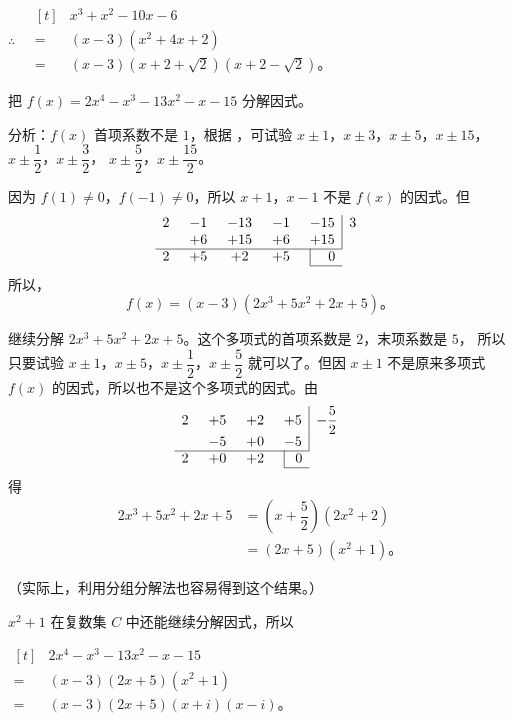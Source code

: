 $\therefore \quad \begin{aligned}[t]
        & x^3 + x^2 - 10x - 6 \\
    ={} & (x - 3) (x^2 + 4x + 2) \\
    ={} & (x - 3) (x + 2 + \sqrt{2}) (x + 2 - \sqrt{2}) \text{。}
\end{aligned}$



\liti 把 $f(x) = 2x^4 - x^3 - 13x^2 -x -15$ 分解因式。

分析：$f(x)$ 首项系数不是 $1$，根据 ，可试验
$x \pm 1$，$x \pm 3$，$x \pm 5$，$x \pm 15$，
$x \pm \dfrac{1}{2}$，$x \pm \dfrac{3}{2}$，
$x \pm \dfrac{5}{2}$，$x \pm \dfrac{15}{2}$。

因为 $f(1) \neq 0$，$f(-1) \neq 0$，所以 $x + 1$，$x - 1$ 不是 $f(x)$ 的因式。但
$$
\begin{array}{*{4}{c@{\hspace{0.5cm}}}c|l}
    2 & -1 & -13 & -1 & -15 & 3 \\
      & +6 & +15 & +6 & +15 &   \\
    \cline{1-5}
    2 & +5 &  +2 & +5 & \multicolumn{1}{|r}{ 0 } & \\
    \cline{5-5}
\end{array}
$$
所以，
$$ f(x) = (x - 3) (2x^3 + 5x^2 + 2x + 5) \text{。} $$

继续分解 $2x^3 + 5x^2 + 2x + 5$。这个多项式的首项系数是 $2$，末项系数是 $5$，
所以只要试验 $x \pm 1$，$x \pm 5$，$x \pm \dfrac{1}{2}$，$x \pm \dfrac{5}{2}$
就可以了。但因 $x \pm 1$ 不是原来多项式 $f(x)$ 的因式，所以也不是这个多项式的因式。由
$$
\begin{array}{*{3}{c@{\hspace{0.5cm}}}c|l}
    2 & +5 & +2 & +5 & -\dfrac{5}{2} \\
      & -5 & +0 & -5 &  \\
    \cline{1-4}
    2 & +0 & +2 & \multicolumn{1}{|r}{ 0 } & \\
    \cline{4-4}
\end{array}
$$
得
\begin{align*}
    2x^3 + 5x^2 + 2x + 5 &= \left( x + \dfrac{5}{2} \right) (2x^2 + 2) \\
        &= (2x + 5)(x^2 + 1) \text{。}
\end{align*}

（实际上，利用分组分解法也容易得到这个结果。）

$x^2 + 1$ 在复数集 $C$ 中还能继续分解因式，所以

$\begin{aligned}[t]
        & 2x^4 - x^3 - 13x^2 -x -15 \\
    ={} & (x - 3) (2x + 5) (x^2 + 1) \\
    ={} & (x - 3) (2x + 5) (x + i) (x - i) \text{。}
\end{aligned}$

